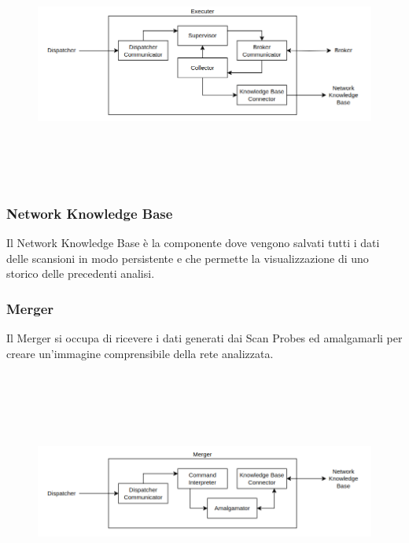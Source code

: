 \documentclass[target=bach,aauheader=,style=]{thud}
\begin{document}
\begin{figure}[h]
  \includegraphics[width=14cm, height=8cm]{executer}
  \centering
\end{figure}

\FloatBarrier


\subsubsection{Network Knowledge Base} 
Il Network Knowledge Base è la componente dove vengono salvati tutti i dati delle scansioni in modo persistente e che permette la visualizzazione di uno storico delle precedenti analisi.

\FloatBarrier

\subsubsection{Merger}
Il Merger si occupa di ricevere i dati generati dai Scan Probes ed amalgamarli per creare un'immagine comprensibile della rete analizzata. 


\begin{figure}[h]
  \includegraphics[width=14cm, height=8cm]{merger}
  \centering
\end{figure}
\end{document}
